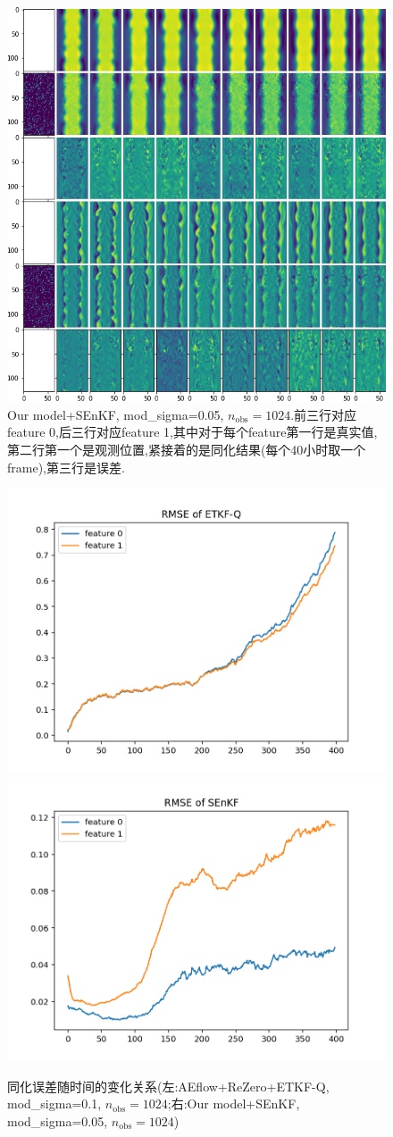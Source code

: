\documentclass{article}
\begin{document}
\begin{figure}
	\centering
	\includegraphics[width=.8\textwidth]{figs/sigma_x_b=0.1_sigma_z_b=0.1_mod_sigma=0.05_n_obs=1024_method=SEnKF_plot.png}
	\caption{Our model+SEnKF, mod\_sigma=0.05, $n_\textrm{obs}=1024$.前三行对应feature 0,后三行对应feature 1,其中对于每个feature第一行是真实值,第二行第一个是观测位置,紧接着的是同化结果(每个40小时取一个frame),第三行是误差.}
\end{figure}
\begin{figure}
	\centering
	\includegraphics[width=.4\textwidth]{figs/sigma_x_b=0.1_sigma_z_b=0.1_mod_sigma=0.1_n_obs=1024_method=ETKF-Q_rmse.png}
	\includegraphics[width=.4\textwidth]{figs/sigma_x_b=0.1_sigma_z_b=0.1_mod_sigma=0.05_n_obs=1024_method=SEnKF_rmse.png}
	\caption{同化误差随时间的变化关系(左:AEflow+ReZero+ETKF-Q, mod\_sigma=0.1, $n_\textrm{obs}=1024$;右:Our model+SEnKF, mod\_sigma=0.05, $n_\textrm{obs}=1024$)}
\end{figure}
\end{document}

